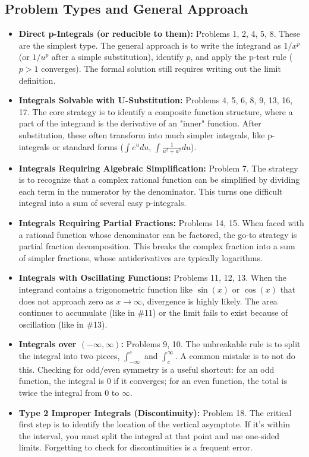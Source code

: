 \documentclass{article}
\begin{document}
\subsection{Problem Types and General Approach}
\begin{itemize}
    \item \textbf{Direct p-Integrals (or reducible to them):} Problems 1, 2, 4, 5, 8. These are the simplest type. The general approach is to write the integrand as $1/x^p$ (or $1/u^p$ after a simple substitution), identify $p$, and apply the p-test rule ($p>1$ converges). The formal solution still requires writing out the limit definition.
    \item \textbf{Integrals Solvable with U-Substitution:} Problems 4, 5, 6, 8, 9, 13, 16, 17. The core strategy is to identify a composite function structure, where a part of the integrand is the derivative of an "inner" function. After substitution, these often transform into much simpler integrals, like p-integrals or standard forms ($\int e^u du$, $\int \frac{1}{u^2+a^2} du$).
    \item \textbf{Integrals Requiring Algebraic Simplification:} Problem 7. The strategy is to recognize that a complex rational function can be simplified by dividing each term in the numerator by the denominator. This turns one difficult integral into a sum of several easy p-integrals.
    \item \textbf{Integrals Requiring Partial Fractions:} Problems 14, 15. When faced with a rational function whose denominator can be factored, the go-to strategy is partial fraction decomposition. This breaks the complex fraction into a sum of simpler fractions, whose antiderivatives are typically logarithms.
    \item \textbf{Integrals with Oscillating Functions:} Problems 11, 12, 13. When the integrand contains a trigonometric function like $\sin(x)$ or $\cos(x)$ that does not approach zero as $x \to \infty$, divergence is highly likely. The area continues to accumulate (like in \#11) or the limit fails to exist because of oscillation (like in \#13).
    \item \textbf{Integrals over $(-\infty, \infty)$:} Problems 9, 10. The unbreakable rule is to split the integral into two pieces, $\int_{-\infty}^c$ and $\int_c^\infty$. A common mistake is to not do this. Checking for odd/even symmetry is a useful shortcut: for an odd function, the integral is 0 if it converges; for an even function, the total is twice the integral from 0 to $\infty$.
    \item \textbf{Type 2 Improper Integrals (Discontinuity):} Problem 18. The critical first step is to identify the location of the vertical asymptote. If it's within the interval, you must split the integral at that point and use one-sided limits. Forgetting to check for discontinuities is a frequent error.
\end{itemize}
\end{document}
